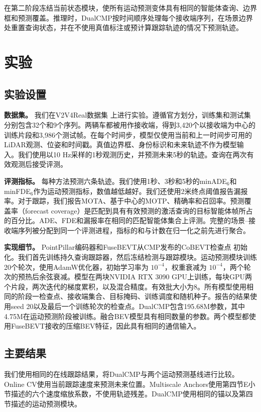 \documentclass[lettersize,journal]{IEEEtran}
\begin{document}
在第二阶段冻结当前状态模块，使所有运动预测变体具有相同的智能体查询、边界框和预测覆盖。推理时，DualCMP按时间顺序处理每个接收端序列，在场景边界处重置查询状态，并在不使用真值标注或预计算跟踪轨迹的情况下预测轨迹。

\section{实验}

\subsection{实验设置}

\textbf{数据集。} 我们在V2V4Real数据集 \cite{xu2023v2v4real} 上进行实验。遵循官方划分，训练集和测试集分别包含32个和9个序列。两辆车都被用作接收端，得到3,420个以接收端为中心的训练片段和3,986个测试帧。在每个时间步，模型仅使用当前和上一时间步可用的LiDAR观测、位姿和时间戳。真值边界框、身份标识和未来轨迹不作为模型输入。我们使用以10 Hz采样的1秒观测历史，并预测未来5秒的轨迹。查询在两次有效观测后接受评测。

\textbf{评测指标。} 每种方法预测六条轨迹。我们使用1秒、3秒和5秒的minADE$_6$和minFDE$_6$作为运动预测指标，数值越低越好。我们还使用2米终点阈值报告漏报率。对于跟踪，我们报告MOTA、基于中心的MOTP、精确率和召回率。预测覆盖率（forecast coverage）是匹配到具有有效预测的激活查询的目标智能体帧所占的百分比。ADE、FDE和漏报率在相同的匹配智能体集合上评测。完整的场景--接收端序列被分配到同一个评测进程，指标的和与计数在归一化之前先进行聚合。

\textbf{实现细节。} PointPillar编码器和FuseBEVT从CMP发布的CoBEVT检查点 \cite{wang2025cmp} 初始化。我们首先训练持久查询跟踪器，然后冻结检测与跟踪模块。运动预测模块训练20个轮次，使用AdamW优化器，初始学习率为 \(10^{-4}\)，权重衰减为 \(10^{-4}\)，两个轮次的预热后余弦衰减。模型在两块NVIDIA RTX 3090 GPU上训练，每块GPU两个片段，两次迭代的梯度累积，以及混合精度。有效批大小为8。所有模型使用相同的阶段一检查点、接收端集合、目标掩码、训练调度和随机种子。报告的结果使用seed 20以及最后一个训练轮次的检查点。DualCMP包含195.68M参数，其中4.75M在运动预测阶段被训练。融合BEV模型具有相同数量的参数。两个模型都使用FuseBEVT接收的压缩BEV特征，因此具有相同的通信输入。

\subsection{主要结果}

我们使用相同的在线跟踪结果，将DualCMP与两个运动预测基线进行比较。Online CV使用当前跟踪速度来预测未来位置。Multiscale Anchors使用第四节E小节描述的六个速度缩放系数，不使用轨迹残差。DualCMP使用相同的锚以及第四节描述的运动预测模块。
\end{document}
